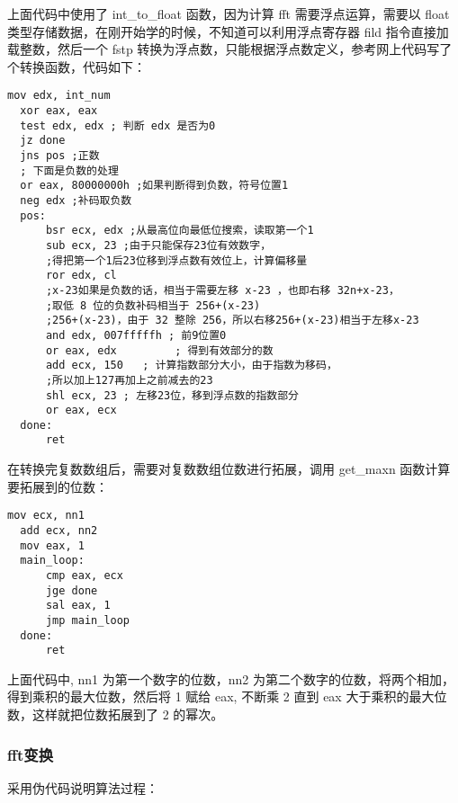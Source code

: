 \documentclass[proposal-report]{bitart}
\begin{document}
上面代码中使用了 int\_to\_float 函数，因为计算 fft 需要浮点运算，需要以 float 类型存储数据，在刚开始学的时候，不知道可以利用浮点寄存器 fild 指令直接加载整数，然后一个 fstp 转换为浮点数，只能根据浮点数定义，参考网上代码写了个转换函数，代码如下：

\begin{lstlisting}[language={[x86masm]Assembler}]
  mov edx, int_num
  xor eax, eax
  test edx, edx ; 判断 edx 是否为0
  jz done
  jns pos ;正数
  ; 下面是负数的处理
  or eax, 80000000h ;如果判断得到负数，符号位置1
  neg edx ;补码取负数
  pos:
      bsr ecx, edx ;从最高位向最低位搜索，读取第一个1
      sub ecx, 23 ;由于只能保存23位有效数字，
      ;得把第一个1后23位移到浮点数有效位上，计算偏移量
      ror edx, cl 
      ;x-23如果是负数的话，相当于需要左移 x-23 ，也即右移 32n+x-23，
      ;取低 8 位的负数补码相当于 256+(x-23)
      ;256+(x-23)，由于 32 整除 256，所以右移256+(x-23)相当于左移x-23
      and edx, 007fffffh ; 前9位置0
      or eax, edx         ; 得到有效部分的数
      add ecx, 150   ; 计算指数部分大小，由于指数为移码，
      ;所以加上127再加上之前减去的23
      shl ecx, 23 ; 左移23位，移到浮点数的指数部分
      or eax, ecx
  done:
      ret
\end{lstlisting}

在转换完复数数组后，需要对复数数组位数进行拓展，调用 get\_maxn 函数计算要拓展到的位数：

\begin{lstlisting}[language={[x86masm]Assembler}]
  mov ecx, nn1
  add ecx, nn2
  mov eax, 1
  main_loop:
      cmp eax, ecx
      jge done 
      sal eax, 1
      jmp main_loop
  done:
      ret
\end{lstlisting}

上面代码中, nn1 为第一个数字的位数，nn2 为第二个数字的位数，将两个相加，得到乘积的最大位数，然后将 1 赋给 eax, 不断乘 2 直到 eax 大于乘积的最大位数，这样就把位数拓展到了 2 的幂次。

\subsubsection{fft变换}

采用伪代码说明算法过程：
\end{document}
